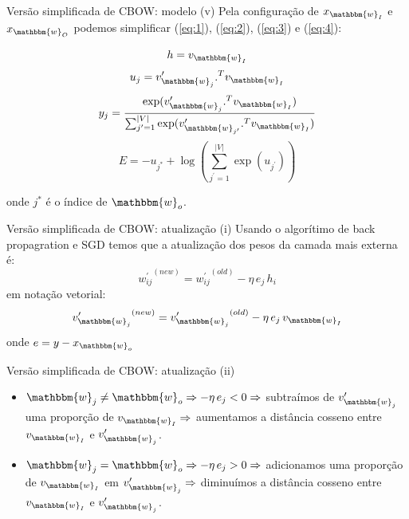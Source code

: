 \documentclass{beamer}
\newcommand{\wo}{\mathbbm{w}}
\begin{document}
\begin{frame}[fragile]{Versão simplificada de CBOW: modelo  (v)}
Pela configuração de $x_{\wo_I}$ e $x_{\wo_O}$ podemos simplificar (\ref{eq:1}), (\ref{eq:2}), (\ref{eq:3}) e (\ref{eq:4}):

\begin{equation}\label{eq5}
h = v_{\wo_{I}}
\end{equation}
\begin{equation}\label{eq:6}
u_j = v^{\prime}_{\wo_{j}} .^{T} v_{\wo_{I}} 
\end{equation}
\begin{equation}\label{eq:7}
y_j =\frac{\exp(v^{\prime}_{\wo_{j}} .^{T} v_{\wo_{I}})}{\sum_{j^{\prime}=1}^{|V|} \exp(v^{\prime}_{\wo_{{j^\prime}}} .^{T} v_{\wo_{I}})} 
\end{equation}
\begin{equation}\label{eq:8}
E = - u_{j^{*}} + \log (\sum_{j^{\prime}=1}^{|V|} \exp (u_{j^{\prime}}))
\end{equation}

onde $j^{*}$ é o índice de $\wo_{o}$. 
\end{frame}

\begin{frame}[fragile]{Versão simplificada de CBOW: atualização  (i)}
Usando o algorítimo de back propagration e SGD temos que a atualização dos pesos da camada mais externa é:
\begin{equation}\label{eq:9}
{w_{ij}^{\prime}}^{(new)} = {w_{ij}^{\prime}}^{(old)} - \eta \, e_{j} \, h_{i}
\end{equation}
em notação vetorial:
\begin{equation}\label{eq:10}
{v^{\prime}_{\wo_{j}}}^{(new)} = {v^{\prime}_{\wo_{j}}}^{(old)} - \eta \, e_{j} \, v_{\wo_{I}}
\end{equation}
onde $e=y -x_{\wo_{o}}$
\end{frame}


\begin{frame}[fragile]{Versão simplificada de CBOW: atualização  (ii)}
\begin{itemize}
\item $\wo_{j}\neq \wo_{o} \Rightarrow -\eta \, e_{j} <0\Rightarrow$ subtraímos de $v^{\prime}_{\wo_{j}}$ uma proporção de $v_{\wo_{I}}\Rightarrow$ aumentamos a distância cosseno entre $v_{\wo_{I}}$ e $v^{\prime}_{\wo_{j}}$.
\vspace{0.3cm}
\item $\wo_{j}= \wo_{o} \Rightarrow -\eta \, e_{j} >0\Rightarrow$ adicionamos uma proporção de $v_{\wo_{I}}$ em $v^{\prime}_{\wo_{j}} \Rightarrow$ diminuímos a distância cosseno entre $v_{\wo_{I}}$ e $v^{\prime}_{\wo_{j}}$. 
\end{itemize}
\end{frame}
\end{document}
